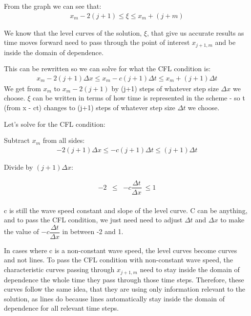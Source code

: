 \documentclass{article}
\newcommand{\bea}{\begin{eqnarray*}}
\newcommand{\eea}{\end{eqnarray*}}
\begin{document}
From the graph we can see that:
\bea
 x_{m}-2(j+1) \leq \xi \leq  x_{m}+(j+m)
\eea

We know that the level curves of the solution, $\xi$, that give us accurate results as time moves forward need to pass through the point of interest $x_{j+1,m}$ and be inside the domain of dependence.\newline

This can be rewritten so we can solve for what the CFL condition is:  
\bea
 x_{m}-2(j+1)\Delta x \leq  x_{m}-c(j+1)\Delta t \leq  x_{m}+(j+1)\Delta t
\eea
We get from $x_{m}$ to $x_{m}-2(j+1)$ by (j+1) steps of whatever step size $\Delta x$ we choose. $\xi$ can be written in terms of how time is represented in the scheme - so t (from x - ct) changes to (j+1) steps of whatever step size $\Delta t$ we choose. \newline

Let's solve for the CFL condition:

Subtract $x_m$ from all sides:
\bea
-2(j+1)\Delta x \leq -c(j+1)\Delta t \leq (j+1)\Delta t
\eea

Divide by $(j + 1)\Delta x$:

\bea
-2 &\leq& -c\dfrac{\Delta t}{\Delta x}\ \leq 1 \\
\eea

c is still the wave speed constant and slope of the level curve. C can be anything, and to pass the CFL condition, we just need need to adjust $\Delta t$ and $\Delta x$ to make the value of $-c\dfrac{\Delta t}{\Delta x}$ in between -2 and 1.
\newline

In cases where c is a non-constant wave speed, the level curves become curves and not lines. To pass the CFL condition with non-constant wave speed, the characteristic curves passing through $x_{j+1,m}$ need to stay inside the domain of dependence the whole time they pass through those time steps. Therefore, these curves follow the same idea, that they are using only information relevant to the solution, as lines do because lines automatically stay inside the domain of dependence for all relevant time steps.
\end{document}
